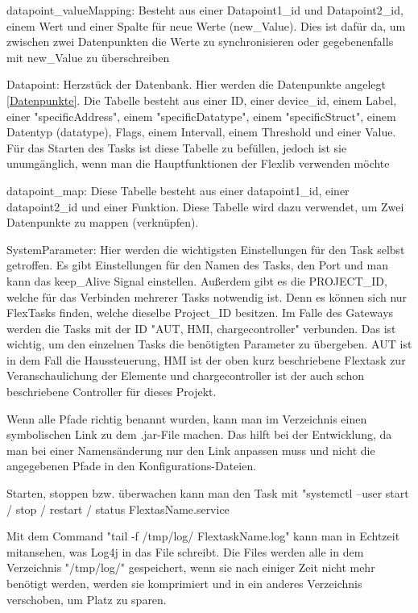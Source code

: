 \begin{compactenum}
\begin{compactenum}
        \item datapoint\_valueMapping: Besteht aus einer Datapoint1\_id und Datapoint2\_id, einem Wert und einer Spalte für neue Werte (new\_Value). Dies ist dafür da, um zwischen zwei Datenpunkten die Werte zu synchronisieren oder gegebenenfalls mit new\_Value zu überschreiben  
        \item Datapoint: Herzstück der Datenbank. Hier werden die Datenpunkte angelegt \ref{Datenpunkte}. Die Tabelle besteht aus einer ID, einer device\_id, einem Label, einer "specificAddress", einem "specificDatatype", einem "specificStruct", einem Datentyp (datatype), Flags, einem Intervall, einem Threshold und einer Value. Für das Starten des Tasks ist diese Tabelle zu befüllen, jedoch ist sie unumgänglich, wenn man die Hauptfunktionen der Flexlib verwenden möchte  
        \item datapoint\_map: Diese Tabelle besteht aus einer datapoint1\_id, einer datapoint2\_id und einer Funktion. Diese Tabelle wird dazu verwendet, um Zwei Datenpunkte zu mappen (verknüpfen). 
        \item SystemParameter: Hier werden die wichtigsten Einstellungen für den Task selbst getroffen. Es gibt Einstellungen für den Namen des Tasks, den Port und man kann das keep\_Alive Signal einstellen. Außerdem gibt es die PROJECT\_ID, welche für das Verbinden mehrerer Tasks notwendig ist. Denn es können sich nur FlexTasks finden, welche dieselbe Project\_ID besitzen. Im Falle des Gateways werden die Tasks mit der ID "AUT, HMI, chargecontroller" verbunden. Das ist wichtig, um den einzelnen Tasks die benötigten Parameter zu übergeben. AUT ist in dem Fall die Haussteuerung, HMI ist der oben kurz beschriebene Flextask zur Veranschaulichung der Elemente und chargecontroller ist der auch schon beschriebene Controller für dieses Projekt.	 
    \end{compactenum}
    \item Wenn alle Pfade richtig benannt wurden, kann man im Verzeichnis einen symbolischen Link zu dem .jar-File machen. Das hilft bei der Entwicklung, da man bei einer Namensänderung nur den Link anpassen muss und nicht die angegebenen Pfade in den Konfigurations-Dateien.   
    \item Starten, stoppen bzw. überwachen kann man den Task mit "systemctl --user start / stop / restart / status FlextasName.service  
    \item Mit dem Command "tail -f /tmp/log/ FlextaskName.log" kann man in Echtzeit mitansehen, was Log4j in das File schreibt. Die Files werden alle in dem Verzeichnis "/tmp/log/" gespeichert, wenn sie nach einiger Zeit nicht mehr benötigt werden, werden sie komprimiert und in ein anderes Verzeichnis verschoben, um Platz zu sparen.   
\end{compactenum}
